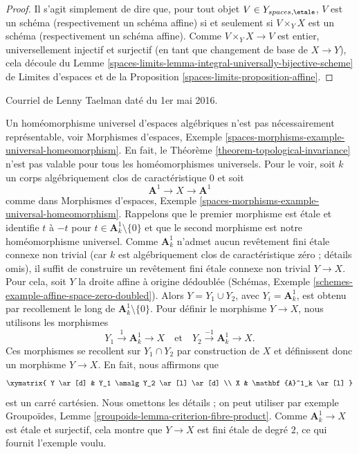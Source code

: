 \begin{proof}
Il s'agit simplement de dire que, pour tout objet
$V \in Y_{spaces, \etale}$, $V$ est un schéma (respectivement un schéma affine) si et
seulement si $V \times_Y X$ est un schéma (respectivement un schéma affine). Comme $V \times_Y X \to V$
est entier, universellement injectif et surjectif (en tant que changement
de base de $X \to Y$), cela
découle du Lemme
\ref{spaces-limits-lemma-integral-universally-bijective-scheme} de Limites d'espaces et de la
Proposition \ref{spaces-limits-proposition-affine}.
\end{proof}

\begin{remark}
\label{remark-topological-invariance-etale-site}
\begin{reference}
Courriel de Lenny Taelman daté du 1er mai 2016.
\end{reference}
Un homéomorphisme universel d'espaces algébriques n'est pas nécessairement représentable, voir
Morphismes d'espaces,
Exemple \ref{spaces-morphisms-example-universal-homeomorphism}.
En fait, le Théorème \ref{theorem-topological-invariance} n'est
pas valable pour tous les homéomorphismes universels. Pour le voir, soit $k$ un
corps algébriquement clos de caractéristique $0$ et soit
$$
\mathbf{A}^1 \to X \to \mathbf{A}^1
$$
comme dans Morphismes d'espaces,
Exemple \ref{spaces-morphisms-example-universal-homeomorphism}.
Rappelons que le premier morphisme est étale et identifie
$t$ à $-t$ pour $t \in \mathbf{A}^1_k \setminus \{0\}$
et que le second morphisme est notre homéomorphisme universel.
Comme $\mathbf{A}^1_k$ n'admet aucun
revêtement fini étale connexe non trivial
(car $k$ est algébriquement clos de caractéristique zéro ; détails omis),
il suffit de construire un revêtement fini étale connexe non trivial
$Y \to X$. Pour cela, soit $Y$ la droite affine
à origine dédoublée
(Schémas, Exemple \ref{schemes-example-affine-space-zero-doubled}).
Alors $Y = Y_1 \cup Y_2$, avec $Y_i = \mathbf{A}^1_k$, est obtenu par recollement
le long de $\mathbf{A}^1_k \setminus \{0\}$.
Pour définir le morphisme $Y \to X$, nous utilisons les morphismes
$$
Y_1 \xrightarrow{1} \mathbf{A}^1_k \to X
\quad\text{et}\quad
Y_2 \xrightarrow{-1} \mathbf{A}^1_k \to X.
$$
Ces morphismes se recollent sur $Y_1 \cap Y_2$ par construction de $X$ et
définissent donc un morphisme $Y \to X$. En fait, nous affirmons que
$$
\xymatrix{
Y \ar[d] & Y_1 \amalg Y_2 \ar[l] \ar[d] \\
X & \mathbf{A}^1_k \ar[l]
}
$$
est un carré cartésien. Nous omettons les détails ; on peut utiliser par exemple
Groupoïdes, Lemme \ref{groupoids-lemma-criterion-fibre-product}.
Comme $\mathbf{A}^1_k \to X$ est étale et
surjectif, cela montre que $Y \to X$
est fini étale de degré $2$, ce qui fournit l'exemple voulu.


\end{remark}
